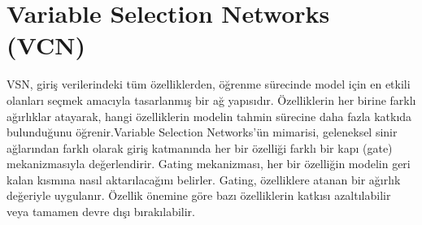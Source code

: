 \section{Variable Selection Networks (VCN)}

VSN, giriş verilerindeki tüm özelliklerden, öğrenme sürecinde model için en etkili olanları seçmek amacıyla tasarlanmış bir ağ yapısıdır. Özelliklerin her birine farklı ağırlıklar atayarak, hangi özelliklerin modelin tahmin sürecine daha fazla katkıda bulunduğunu öğrenir.Variable Selection Networks'ün mimarisi, geleneksel sinir ağlarından farklı olarak giriş katmanında her bir özelliği farklı bir kapı (gate) mekanizmasıyla değerlendirir. Gating mekanizması, her bir özelliğin modelin geri kalan kısmına nasıl aktarılacağını belirler. Gating, özelliklere atanan bir ağırlık değeriyle uygulanır. Özellik önemine göre bazı özelliklerin katkısı azaltılabilir veya tamamen devre dışı bırakılabilir.

\newpage
